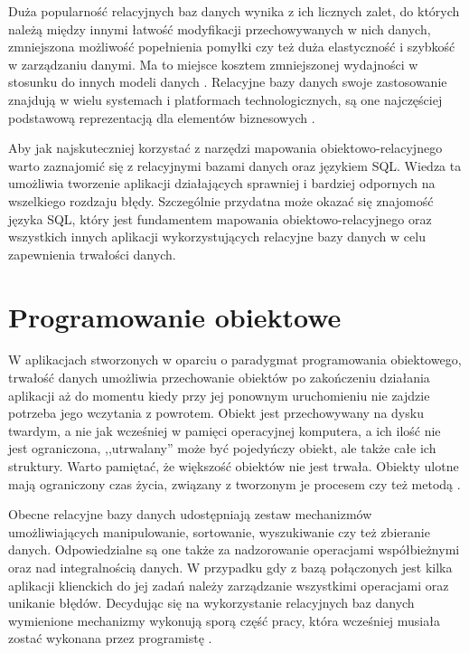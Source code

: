 \documentclass[12pt]{report}
\begin{document}
Duża popularność relacyjnych baz danych wynika z ich licznych zalet, do któ\-rych należą między innymi łatwość modyfikacji przechowywanych w nich danych, zmniejszona
możliwość popełnienia pomyłki czy też duża elastyczność i szybkość w zarządzaniu danymi. Ma to miejsce kosztem zmniejszonej wydajności w stosunku do innych modeli
danych \cite{persistence}. Relacyjne bazy danych swoje zastosowanie znajdują w wielu systemach i platformach technologicznych, są one najczęściej podstawową 
reprezentacją dla elementów biznesowych \cite{hibernate}.

Aby jak najskuteczniej korzystać z narzędzi mapowania obiektowo-relacyjnego warto zaznajomić się z relacyjnymi bazami danych oraz językiem SQL. Wiedza ta umożliwia
tworzenie aplikacji działających sprawniej i bardziej odpornych na wszelkiego rozdzaju błędy. Szczególnie przydatna może okazać się znajomość języka SQL, który jest 
fundamentem mapowania obiektowo-relacyjnego oraz wszystkich innych aplikacji wykorzystujących relacyjne bazy danych w celu zapewnienia trwałości danych.

\section{Programowanie obiektowe}

W aplikacjach stworzonych w oparciu o paradygmat programowania obiektowego, trwałość danych umożliwia przechowanie obiektów po zakończeniu działania aplikacji aż do
momentu kiedy przy jej ponownym uruchomieniu nie zajdzie potrzeba jego wczytania z powrotem. Obiekt jest przechowywany na dysku twardym, a nie jak wcześniej w pamięci
operacyjnej komputera, a ich ilość nie jest ograniczona, ,,utrwalany'' może być pojedyńczy obiekt, ale także całe ich struktury. Warto pamiętać, że większość obiektów nie jest
trwała. Obiekty ulotne mają ograniczony czas życia, związany z tworzonym je procesem czy też metodą \cite{hibernate}.

Obecne relacyjne bazy danych udostępniają zestaw mechanizmów umożliwia\-jących manipulowanie, sortowanie, wyszukiwanie czy też zbieranie danych. Odpo\-wiedzialne są 
one także za nadzorowanie operacjami współbieżnymi  oraz nad inte\-gralnością danych. W przypadku gdy z bazą połączonych jest kilka aplikacji klienckich do jej zadań należy
zarządzanie wszystkimi operacjami oraz unikanie błędów. Decydując się na wykorzystanie relacyjnych baz danych wymienione mechanizmy wykonują sporą część pracy, która
wcześniej musiała zostać wykonana przez pro\-gramistę \cite{persistence}.
\end{document}
